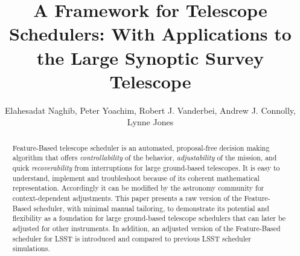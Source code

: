 \documentclass[11pt]{article}
\date{}
\theoremstyle{definition}
\begin{document}
\title{A Framework for Telescope Schedulers: With Applications to the Large Synoptic Survey Telescope}
\author{Elahesadat Naghib, Peter Yoachim, Robert J. Vanderbei, Andrew J. Connolly, Lynne Jones}

\maketitle


\begin{abstract}

Feature-Based telescope scheduler is an automated, proposal-free decision making algorithm that offers \textit{controllability} of the behavior, \textit{adjustability} of the mission, and quick \textit{recoverability} from interruptions for large ground-based telescopes. It is easy to understand, implement and troubleshoot because of its coherent mathematical representation. Accordingly it can be modified by the astronomy community for context-dependent adjustments. This paper presents a raw version of the Feature-Based scheduler, with minimal manual tailoring, to demonstrate its potential and flexibility as a foundation for large ground-based telescope schedulers that can later be adjusted for other instruments. In addition, an adjusted version of the Feature-Based scheduler for LSST is introduced and compared to previous LSST scheduler simulations.
\end{abstract}
\end{document}
